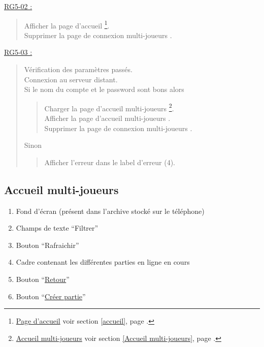 \documentclass{report}
\begin{document}
				
			\underline{RG5-02 :}
				\begin{quote}
					Afficher la page d'accueil%
						\footnote[3]{
							\hyperlink{Page d'accueil}{Page d'accueil}
							\og voir section \ref{accueil}, page \pageref{accueil}.\fg
						}.\\
					Supprimer la page de connexion multi-joueurs \footnotemark[2].\\			
				\end{quote}	
				
				
			\underline{RG5-03 :}
				\begin{quote}
					Vérification des paramètres passés.\\
					Connexion au serveur distant.\\
					Si le nom du compte et le password sont bons alors
					\begin{quote}					
						Charger la page d'accueil multi-joueurs%
							\footnote[4]{
								\hyperlink{Accueil multi-joueurs}{Accueil multi-joueurs}
								\og voir section \ref{Accueil multi-joueurs}, page \pageref{Accueil multi-joueurs}.\fg
							}.\\
						Afficher la page d'accueil multi-joueurs \footnotemark[4].\\
						Supprimer la page de connexion multi-joueurs \footnotemark[2].
					\end{quote}	
					Sinon
					\begin{quote}
						Afficher l'erreur dans le label d'erreur (4).
					\end{quote}					
				\end{quote}	

\newpage

	\subsection{Accueil multi-joueurs}

		\hypertarget{Accueil multi-joueurs}{}
		\label{Accueil multi-joueurs}

		\begin{center}
			
		\end{center}

		\begin{enumerate}
		  \item Fond d'écran (présent dans l'archive stocké sur le téléphone)
		  \item Champs de texte ``Filtrer''
		  \item Bouton ``Rafraichir''
		  \item Cadre contenant les différentes parties en ligne en cours
		  \item Bouton ``\hyperlink{Page d'accueil}{Retour}''
		  \item Bouton ``\hyperlink{Creer partie multi-joueurs}{Créer partie}''
		\end{enumerate}
\end{document}

